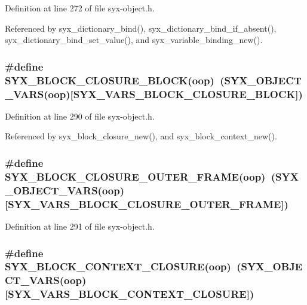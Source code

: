 Definition at line 272 of file syx-object.h.

Referenced by syx\_\-dictionary\_\-bind(), syx\_\-dictionary\_\-bind\_\-if\_\-absent(), syx\_\-dictionary\_\-bind\_\-set\_\-value(), and syx\_\-variable\_\-binding\_\-new().\hypertarget{syx-object_8h_3b6abd50b74d739d7866ac4a34c9186c}{
\subsubsection{\setlength{\rightskip}{0pt plus 5cm}\#define SYX\_\-BLOCK\_\-CLOSURE\_\-BLOCK(oop)~(SYX\_\-OBJECT\_\-VARS(oop)\mbox{[}SYX\_\-VARS\_\-BLOCK\_\-CLOSURE\_\-BLOCK\mbox{]})}}
\label{syx-object_8h_3b6abd50b74d739d7866ac4a34c9186c}




Definition at line 290 of file syx-object.h.

Referenced by syx\_\-block\_\-closure\_\-new(), and syx\_\-block\_\-context\_\-new().\hypertarget{syx-object_8h_f517578c6962e7925851fb6d88ebfa98}{
\subsubsection{\setlength{\rightskip}{0pt plus 5cm}\#define SYX\_\-BLOCK\_\-CLOSURE\_\-OUTER\_\-FRAME(oop)~(SYX\_\-OBJECT\_\-VARS(oop)\mbox{[}SYX\_\-VARS\_\-BLOCK\_\-CLOSURE\_\-OUTER\_\-FRAME\mbox{]})}}
\label{syx-object_8h_f517578c6962e7925851fb6d88ebfa98}




Definition at line 291 of file syx-object.h.\hypertarget{syx-object_8h_ba94eb81806582fdd6ada41055269946}{
\subsubsection{\setlength{\rightskip}{0pt plus 5cm}\#define SYX\_\-BLOCK\_\-CONTEXT\_\-CLOSURE(oop)~(SYX\_\-OBJECT\_\-VARS(oop)\mbox{[}SYX\_\-VARS\_\-BLOCK\_\-CONTEXT\_\-CLOSURE\mbox{]})}}
\label{syx-object_8h_ba94eb81806582fdd6ada41055269946}





